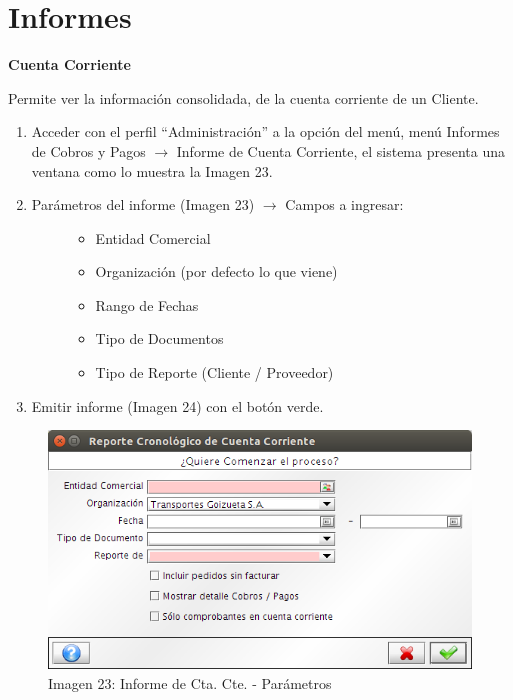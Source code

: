 \documentclass[letterpaper,10pt,spanish]{sphinxmanual}
\begin{document}
\section{Informes}
\label{ventas:informes}
\textbf{Cuenta Corriente}

Permite ver la información consolidada, de la cuenta corriente de un Cliente.
\begin{enumerate}
\item {} 
Acceder con el perfil ``Administración'' a la opción del menú, menú Informes de Cobros y Pagos \(\rightarrow\)  Informe de Cuenta Corriente, el sistema presenta una ventana como lo muestra la Imagen 23.

\item {} \begin{description}
\item[{Parámetros del informe (Imagen 23) \(\rightarrow\) Campos a ingresar:}] \leavevmode\begin{itemize}
\item {} 
Entidad Comercial

\item {} 
Organización (por defecto lo que viene)

\item {} 
Rango de Fechas

\item {} 
Tipo de Documentos

\item {} 
Tipo de Reporte (Cliente / Proveedor)

\end{itemize}

\end{description}

\item {} 
Emitir informe (Imagen 24) con el botón verde.

\end{enumerate}
\begin{figure}[htbp]
\centering
\capstart

\includegraphics{ly_informe_23.png}
\caption{Imagen 23: Informe de Cta. Cte. - Parámetros}\end{figure}
\end{document}

